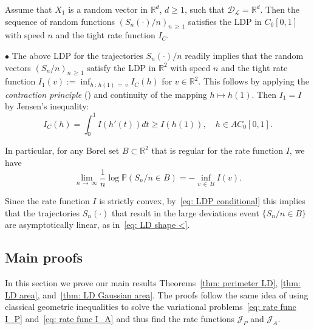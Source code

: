 \documentclass[AHL,Unicode,published]{cedram}
\newcommand{\Rbb}{\mathbb{R}}
\newcommand{\Pbb}{\mathbb{P}}
\newcommand{\Dcl}{\mathcal{D}}
\newcommand{\Lcl}{\mathcal{L}}
\newcommand{\Jcl}{\mathcal{J}}
\begin{document}
\begin{theo*}
Assume that $X_1$ is a random vector in $\Rbb^d$, $d \ge 1$, such that $\Dcl_{\Lcl} = \Rbb^d$. Then the sequence of random functions $(S_n(\cdot)/n)_{n\,\ge\,1}$ satisfies the LDP in $C_0[0,1]$ with speed $n$ and the tight rate function $I_C$.
\end{theo*}
$\bullet$ The above LDP for the trajectories $S_n(\cdot)/n$ readily implies that the random vectors $(S_n/n)_{n\,\ge\,1}$ satisfy the LDP in $\Rbb^2$ with speed $n$ and the tight rate function $I_1(v) := \inf_{h\,:\,h(1)\,=\,v} I_C(h)$ for $v \in \Rbb^2$. This follows by applying the \emph{contraction principle} (\cite[Theorem~4.2.1]{DemboZeitouni}) and continuity of the mapping $h \mapsto h(1)$. Then $I_1=I$ by Jensen's inequality:
\begin{equation}\label{eqn: Jensen direct}
I_C(h)=\int_0^1 I(h'(t))dt \ge I(h(1)), \quad h \in AC_0[0,1].
\end{equation}

In particular, for any Borel set $B \subset \Rbb^2$ that is regular for the rate function $I$, we have
\[
\lim_{n\,\to\,\infty} \frac{1}{n} \log \Pbb(S_n/n \in B) =- \inf_{v\,\in\,B} I(v).
\]

Since the rate function $I$ is strictly convex, by~\eqref{eq: LDP conditional} this implies that the trajectories $S_n(\cdot)$ that result in the large deviations event $\{S_n/n \in B\}$ are asymptotically linear, as in~\eqref{eq: LD shape <}.



\subsection{Main proofs} \label{Sec: main proofs}
In this section we prove our main results Theorems~\ref{thm: perimeter LD}, \ref{thm: LD area}, and~\ref{thm: LD Gaussian area}. The proofs follow the same idea of using classical geometric inequalities to solve the variational problems~\eqref{eq: rate func I_P} and~\eqref{eq: rate func I_A} and thus find the rate functions $\Jcl_P$ and $\Jcl_A$.
\goodbreak
\end{document}
